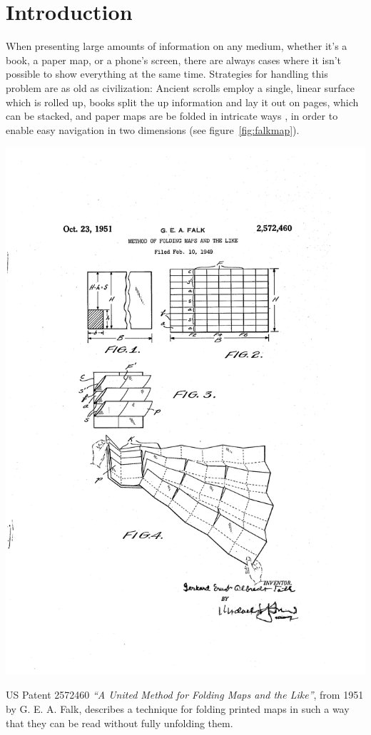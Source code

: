 \documentclass[nobib]{tufte-book} %
\begin{document}
\chapter{Introduction} %

When presenting large amounts of information on any medium, whether it's a book, a paper map, or a phone's screen, there are always cases where it isn't possible to show everything at the same time. Strategies for handling this problem are as old as civilization: Ancient scrolls employ a single, linear surface which is rolled up, books split the up information and lay it out on pages, which can be stacked, and paper maps are be folded in intricate ways \cite{angsusser2012map}, in order to enable easy navigation in two dimensions (see figure~\ref{fig:falkmap}).

\begin{marginfigure}
  \includegraphics[width=\linewidth]{falk-patent.png}
  \caption{US Patent 2572460 \emph{``A United Method for Folding Maps and the Like''}, from 1951 by G. E. A. Falk, describes a technique for folding printed maps in such a way that they can be read without fully unfolding them.}
  \label{fig:falkmap}
\end{marginfigure}
\end{document}
